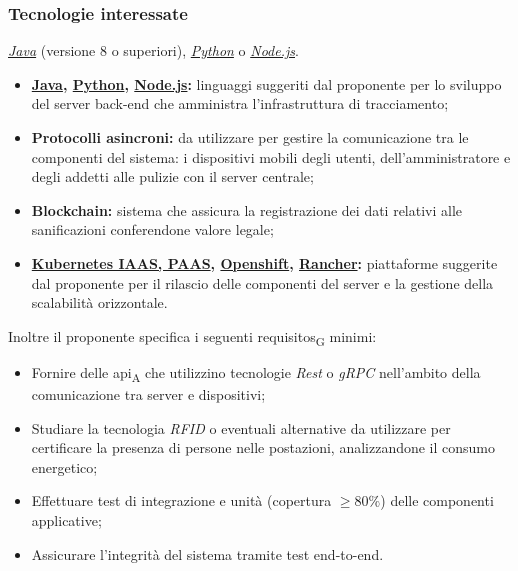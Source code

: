 \subsubsection{Tecnologie interessate}

\textit{\href{https://www.java.com/it/about/}{Java}} (versione 8 o superiori), \textit{\href{https://www.python.org/about/}{Python}} o \textit{\href{https://nodejs.org/it/about/}{Node.js}}.
\begin{itemize}
	\item{\textbf{\href{https://www.java.com/it/about/}{Java}, \href{https://www.python.org/about/}{Python}, \href{https://nodejs.org/it/about/}{Node.js}:}} linguaggi suggeriti dal proponente per lo sviluppo del server back-end che amministra l'infrastruttura di tracciamento;
	\item{\textbf{Protocolli asincroni:}} da utilizzare per gestire la comunicazione tra le componenti del sistema: i dispositivi mobili degli utenti, dell'amministratore e degli addetti alle pulizie con il server centrale;
	\item{\textbf{Blockchain:}} sistema che assicura la registrazione dei dati relativi alle sanificazioni conferendone valore legale;  
	\item{\textbf{\href{https://kubernetes.io/it/docs/concepts/overview/what-is-kubernetes/}{Kubernetes IAAS, PAAS}, \href{https://www.openshift.com/learn/what-is-openshift}{Openshift}, \href{https://rancher.com/about/}{Rancher}:}} piattaforme suggerite dal proponente per il rilascio delle componenti del server e la gestione della scalabilità orizzontale.
\end{itemize}

Inoltre il proponente specifica i seguenti \glspl{requisito}\textsubscript{G} minimi:
\begin{itemize}
	\item Fornire delle \acrshort{api}\textsubscript{A} che utilizzino tecnologie \textit{Rest} o \textit{gRPC} nell'ambito della comunicazione tra server e dispositivi;
	\item Studiare la tecnologia \textit{RFID} o eventuali alternative da utilizzare per certificare la presenza di persone nelle postazioni, analizzandone il consumo energetico;
	\item Effettuare test di integrazione e unità (copertura $\geq 80\%$) delle componenti applicative;
	\item Assicurare l'integrità del sistema tramite test end-to-end.
\end{itemize}
	
